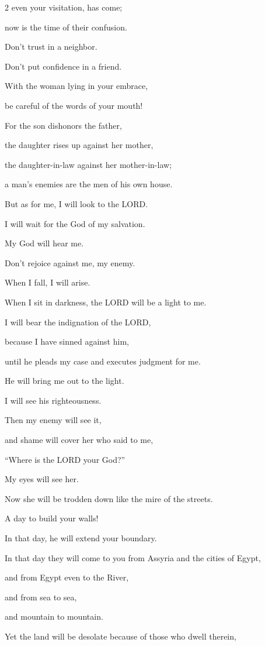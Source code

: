 \begin{multicols}{2}
even your visitation, has come;

now is the time of their confusion.

\myverse{}Don’t trust in a neighbor.

Don’t put confidence in a friend.

With the woman lying in your embrace,

be careful of the words of your mouth!

\myverse{}For the son dishonors the father,

the daughter rises up against her mother,

the daughter-in-law against her mother-in-law;

a man’s enemies are the men of his own house.

\myverse{}But as for me, I will look to the LORD.

I will wait for the God of my salvation.

My God will hear me.

\myverse{}Don’t rejoice against me, my enemy.

When I fall, I will arise.

When I sit in darkness, the LORD will be a light to me.

\myverse{}I will bear the indignation of the LORD,

because I have sinned against him,

until he pleads my case and executes judgment for me.

He will bring me out to the light.

I will see his righteousness.

\myverse{}Then my enemy will see it,

and shame will cover her who said to me,

“Where is the LORD your God?”

My eyes will see her.

Now she will be trodden down like the mire of the streets.

\myverse{}A day to build your walls!

In that day, he will extend your boundary.

\myverse{}In that day they will come to you from Assyria and the cities
of Egypt,

and from Egypt even to the River,

and from sea to sea,

and mountain to mountain.

\myverse{}Yet the land will be desolate because of those who dwell therein,


\end{multicols}
